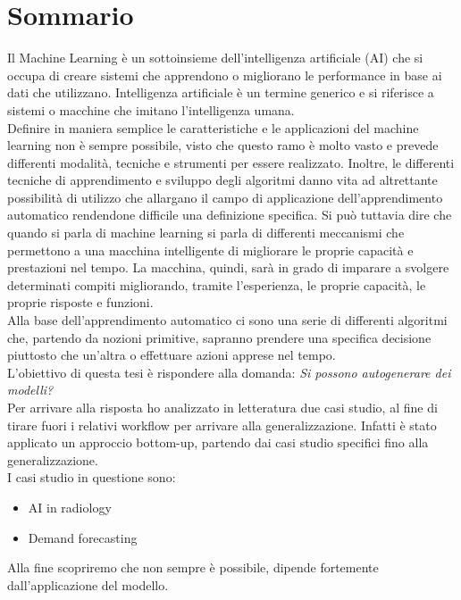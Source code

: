 \documentclass[12pt,a4paper]{report}
\begin{document}
\chapter*{Sommario}
Il Machine Learning è un sottoinsieme dell'intelligenza artificiale (AI) che si occupa di creare sistemi che apprendono o migliorano le performance in base ai dati che utilizzano. Intelligenza artificiale è un termine generico e si riferisce a sistemi o macchine che imitano l'intelligenza umana.\\
Definire in maniera semplice le caratteristiche e le applicazioni del machine learning non è sempre possibile, visto che questo ramo è molto vasto e prevede differenti modalità, tecniche e strumenti per essere realizzato. Inoltre, le differenti tecniche di apprendimento e sviluppo degli algoritmi danno vita ad altrettante possibilità di utilizzo che allargano il campo di applicazione dell’apprendimento automatico rendendone difficile una definizione specifica. Si può tuttavia dire che quando si parla di machine learning si parla di differenti meccanismi che permettono a una macchina intelligente di migliorare le proprie capacità e prestazioni nel tempo. La macchina, quindi, sarà in grado di imparare a svolgere determinati compiti migliorando, tramite l’esperienza, le proprie capacità, le proprie risposte e funzioni.\\
Alla base dell’apprendimento automatico ci sono una serie di differenti algoritmi che, partendo da nozioni primitive, sapranno prendere una specifica decisione piuttosto che un’altra o effettuare azioni apprese nel tempo.\\
L'obiettivo di questa tesi è rispondere alla domanda: \emph{Si possono autogenerare dei modelli?}\\
Per arrivare alla risposta ho analizzato in letteratura due casi studio, al fine di tirare fuori i relativi workflow per arrivare alla generalizzazione. Infatti è stato applicato un approccio bottom-up, partendo dai casi studio specifici fino alla generalizzazione.\\
I casi studio in questione sono:
\begin{itemize}
\item AI in radiology
\item Demand forecasting
\end{itemize}
Alla fine scopriremo che non sempre è possibile, dipende fortemente dall'applicazione del modello.

\tableofcontents
\end{document}
